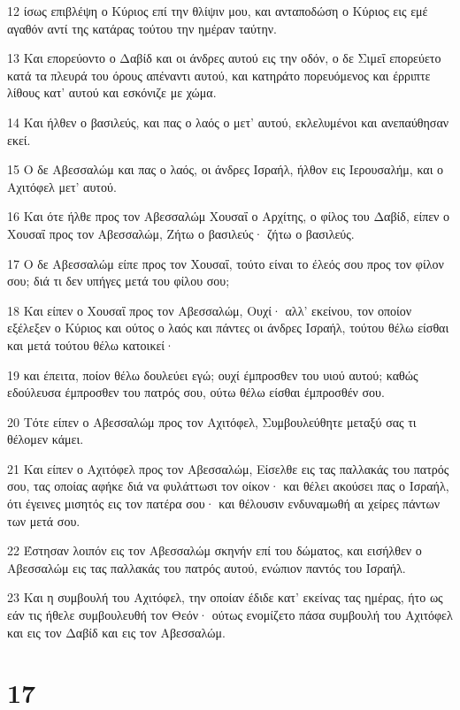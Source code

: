 \par 12 ίσως επιβλέψη ο Κύριος επί την θλίψιν μου, και ανταποδώση ο Κύριος εις εμέ αγαθόν αντί της κατάρας τούτου την ημέραν ταύτην.
\par 13 Και επορεύοντο ο Δαβίδ και οι άνδρες αυτού εις την οδόν, ο δε Σιμεΐ επορεύετο κατά τα πλευρά του όρους απέναντι αυτού, και κατηράτο πορευόμενος και έρριπτε λίθους κατ' αυτού και εσκόνιζε με χώμα.
\par 14 Και ήλθεν ο βασιλεύς, και πας ο λαός ο μετ' αυτού, εκλελυμένοι και ανεπαύθησαν εκεί.
\par 15 Ο δε Αβεσσαλώμ και πας ο λαός, οι άνδρες Ισραήλ, ήλθον εις Ιερουσαλήμ, και ο Αχιτόφελ μετ' αυτού.
\par 16 Και ότε ήλθε προς τον Αβεσσαλώμ Χουσαΐ ο Αρχίτης, ο φίλος του Δαβίδ, είπεν ο Χουσαΐ προς τον Αβεσσαλώμ, Ζήτω ο βασιλεύς· ζήτω ο βασιλεύς.
\par 17 Ο δε Αβεσσαλώμ είπε προς τον Χουσαΐ, τούτο είναι το έλεός σου προς τον φίλον σου; διά τι δεν υπήγες μετά του φίλου σου;
\par 18 Και είπεν ο Χουσαΐ προς τον Αβεσσαλώμ, Ουχί· αλλ' εκείνου, τον οποίον εξέλεξεν ο Κύριος και ούτος ο λαός και πάντες οι άνδρες Ισραήλ, τούτου θέλω είσθαι και μετά τούτου θέλω κατοικεί·
\par 19 και έπειτα, ποίον θέλω δουλεύει εγώ; ουχί έμπροσθεν του υιού αυτού; καθώς εδούλευσα έμπροσθεν του πατρός σου, ούτω θέλω είσθαι έμπροσθέν σου.
\par 20 Τότε είπεν ο Αβεσσαλώμ προς τον Αχιτόφελ, Συμβουλεύθητε μεταξύ σας τι θέλομεν κάμει.
\par 21 Και είπεν ο Αχιτόφελ προς τον Αβεσσαλώμ, Είσελθε εις τας παλλακάς του πατρός σου, τας οποίας αφήκε διά να φυλάττωσι τον οίκον· και θέλει ακούσει πας ο Ισραήλ, ότι έγεινες μισητός εις τον πατέρα σου· και θέλουσιν ενδυναμωθή αι χείρες πάντων των μετά σου.
\par 22 Έστησαν λοιπόν εις τον Αβεσσαλώμ σκηνήν επί του δώματος, και εισήλθεν ο Αβεσσαλώμ εις τας παλλακάς του πατρός αυτού, ενώπιον παντός του Ισραήλ.
\par 23 Και η συμβουλή του Αχιτόφελ, την οποίαν έδιδε κατ' εκείνας τας ημέρας, ήτο ως εάν τις ήθελε συμβουλευθή τον Θεόν· ούτως ενομίζετο πάσα συμβουλή του Αχιτόφελ και εις τον Δαβίδ και εις τον Αβεσσαλώμ.

\chapter{17}

